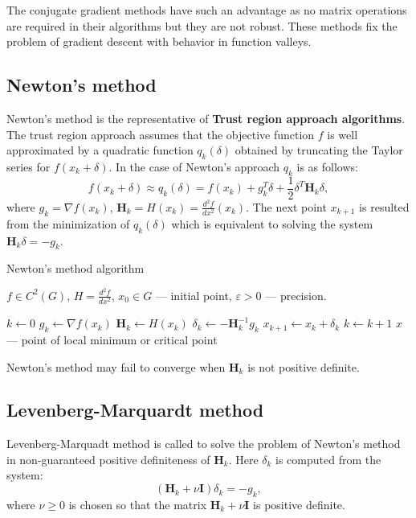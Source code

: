 \documentclass[12pt, bachelor, substylefile = algo_title.rtx]{disser}
\newcommand{\eps}{\varepsilon}
\theoremstyle{definition}
\begin{document}
The conjugate gradient methods have such an advantage as no matrix operations are required in their algorithms but they are not robust. These methods fix the problem of gradient descent with behavior in function valleys.

\subsection{Newton's method}
Newton's method is the representative of \textbf{Trust region approach algorithms}. The trust region approach assumes that the objective function $f$ is well approximated by a quadratic function $q_k (\delta)$ obtained by truncating the Taylor series for $f(x_k + \delta)$. In the case of Newton's approach $q_k$ is as follows:
\[ f(x_k + \delta) \approx q_k(\delta) = f(x_k) + g_k^T \delta + \frac{1}{2} \delta^T \mathbf{H}_k \delta, \]
where $g_k = \nabla f(x_k)$, $\mathbf{H}_k = H(x_k) = \frac{d^2 f}{dx^2}(x_k)$. The next point $x_{k+1}$ is resulted from the minimization of $q_k(\delta)$ which is equivalent to solving the system $\mathbf{H}_k \delta = -g_k$.

\begin{algorithm}[h]
\caption{Newton's method algorithm}
\label{alg: newton}
\begin{algorithmic}

\Require $f \in C^2(G)$, $H = \frac{d^2 f}{dx^2}$, $x_0 \in G$ --- initial point, $\eps>0$ --- precision. 

\State $k \gets 0$
\While{$\|x_k - x_{k-1}\| > \eps$}
\State $g_k \gets \nabla f(x_k)$
\State $\mathbf{H}_k \gets H(x_k)$
\State $\delta_k \gets -\mathbf{H}^{-1}_k g_k$
\State $x_{k+1} \gets x_{k} + \delta_{k}$
\State $k \gets k+1$
\EndWhile
\Ensure $\widehat{x}$ --- point of local minimum or critical point
\end{algorithmic}
\end{algorithm}

Newton’s method may fail to converge when $\mathbf{H}_k$ is not positive definite.

\subsection{Levenberg-Marquardt method}
Levenberg-Marquadt method is called to solve the problem of Newton's method in non-guaranteed positive definiteness of $\mathbf{H}_k$. Here $\delta_k$ is computed from the system:
\[ (\mathbf{H}_k + \nu \mathbf{I})\delta_k = -g_k, \]
where $\nu \ge 0$ is chosen so that the matrix $\mathbf{H}_k + \nu \mathbf{I}$ is positive definite.
\end{document}
